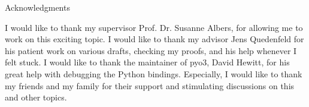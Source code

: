 \thispagestyle{empty}

\vspace*{20mm}

\begin{center}
{ Acknowledgments}
\end{center}

\vspace{10mm}

I would like to thank my supervisor Prof. Dr. Susanne Albers, for allowing me to work on this exciting topic. I would like to thank my advisor Jens Quedenfeld for his patient work on various drafts, checking my proofs, and his help whenever I felt stuck. I would like to thank the maintainer of pyo3, David Hewitt, for his great help with debugging the Python bindings. Especially, I would like to thank my friends and my family for their support and stimulating discussions on this and other topics.

\cleardoublepage{}
